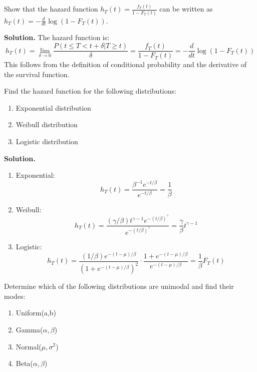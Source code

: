 \begin{problembox}
Show that the hazard function $h_T(t) = \frac{f_T(t)}{1-F_T(t)}$ can be written as $h_T(t) = -\frac{d}{dt}\log(1-F_T(t))$.
\end{problembox}

\noindent\textbf{Solution.}
The hazard function is:
\[
h_T(t) = \lim_{\delta\to 0}\frac{P(t\leq T<t+\delta|T\geq t)}{\delta} = \frac{f_T(t)}{1-F_T(t)} = -\frac{d}{dt}\log(1-F_T(t))
\]
This follows from the definition of conditional probability and the derivative of the survival function.

\begin{problembox}
Find the hazard function for the following distributions:
\begin{enumerate}[label=(\alph*)]
\item Exponential distribution
\item Weibull distribution
\item Logistic distribution
\end{enumerate}
\end{problembox}

\noindent\textbf{Solution.}
\begin{enumerate}[label=(\alph*)]
\item Exponential:
\[
h_T(t) = \frac{\beta^{-1}e^{-t/\beta}}{e^{-t/\beta}} = \frac{1}{\beta}
\]

\item Weibull:
\[
h_T(t) = \frac{(\gamma/\beta)t^{\gamma-1}e^{-(t/\beta)^\gamma}}{e^{-(t/\beta)^\gamma}} = \frac{\gamma}{\beta}t^{\gamma-1}
\]

\item Logistic:
\[
h_T(t) = \frac{(1/\beta)e^{-(t-\mu)/\beta}}{(1+e^{-(t-\mu)/\beta})^2} \cdot \frac{1+e^{-(t-\mu)/\beta}}{e^{-(t-\mu)/\beta}} = \frac{1}{\beta}F_T(t)
\]
\end{enumerate}

\begin{problembox}
Determine which of the following distributions are unimodal and find their modes:
\begin{enumerate}[label=(\alph*)]
\item Uniform(a,b)
\item Gamma($\alpha,\beta$)
\item Normal($\mu,\sigma^2$)
\item Beta($\alpha,\beta$)
\end{enumerate}
\end{problembox}

